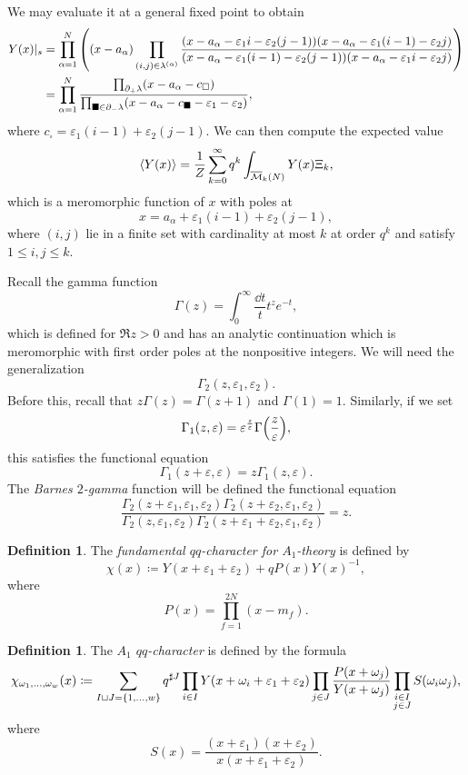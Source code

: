 \documentclass[leqno, openany]{memoir}
\theoremstyle{definition}
\newtheorem{defn}[thm]{Definition}
\theoremstyle{remark}
\theoremstyle{plain}
\theoremstyle{definition}
\theoremstyle{remark}
\newcommand{\ep}{\varepsilon}
\newcommand{\mc}[1]{\mathcal{#1}}
\newcommand{\ol}[1]{\overline{#1}}
\begin{document}
We may evaluate it at a general fixed point to obtain
\begin{align*}
    Y(x)|_s &= \prod_{\alpha=1}^N \qty((x-a_{\alpha}) \prod_{(i,j) \in \lambda^{(\alpha)}} \frac{(x-a_{\alpha}-\ep_1 i - \ep_2(j-1))(x-a_{\alpha} - \ep_1(i-1) - \ep_2 j)}{(x-a_{\alpha}-\ep_1(i-1) - \ep_2(j-1))(x-a_{\alpha}-\ep_1 i - \ep_2 j)}) \\
    &= \prod_{\alpha=1}^N \frac{\prod_{\box \in \partial_+ \lambda} (x-a_{\alpha} - c_{\square})}{\prod_{\blacksquare \in \partial_- \lambda} (x-a_{\alpha} - c_{\blacksquare} - \ep_1 - \ep_2)},
\end{align*}
where $c_{\square} = \ep_1(i-1) + \ep_2(j-1)$. We can then compute the expected value
\[ \ev{Y(x)} = \frac{1}{Z} \sum_{k=0}^{\infty} q^k \int_{\ol{\mc{M}}_k(N)} Y(x) \Xi_k, \]
which is a meromorphic function of $x$ with poles at
\[ x= a_{\alpha} + \ep_1(i-1) + \ep_2(j-1), \]
where $(i, j)$ lie in a finite set with cardinality at most $k$ at order $q^k$ and satisfy $1 \leq i, j \leq k$.

Recall the gamma function
\[ \Gamma(z) = \int_0^{\infty} \frac{\dd t}{t} t^z e^{-t}, \]
which is defined for $\Re z > 0$ and has an analytic continuation which is meromorphic with first order poles at the nonpositive integers. We will need the generalization
\[ \Gamma_2(z, \ep_1, \ep_2). \]
Before this, recall that $z \Gamma(z) = \Gamma(z+1)$ and $\Gamma(1) = 1$. Similarly, if we set
\[ \Gamma_1(z, \ep) = \ep^{\frac{z}{\ep}} \Gamma\qty(\frac{z}{\ep}), \]
this satisfies the functional equation
\[ \Gamma_1(z+\ep, \ep) = z \Gamma_1(z, \ep). \]
The \textit{Barnes $2$-gamma} function will be defined the functional equation
\[ \frac{\Gamma_2(z+\ep_1, \ep_1, \ep_2)\Gamma_2(z+\ep_2, \ep_1, \ep_2)}{\Gamma_2(z, \ep_1, \ep_2) \Gamma_2(z+\ep_1+\ep_2, \ep_1, \ep_2)} = z. \]

\begin{defn}
    The \textit{fundamental $qq$-character for $A_1$-theory} is defined by
    \[ \chi(x) \coloneqq Y(x+\ep_1 + \ep_2) + q P(x) Y(x)^{-1}, \]
    where
    \[ P(x) = \prod_{f=1}^{2N}(x-m_f). \]
\end{defn}

\begin{defn}
    The \textit{$A_1$ $qq$-character} is defined by the formula
    \[ \chi_{\omega_1, \ldots, \omega_w}(x) \coloneqq \sum_{I \sqcup J = \qty{1,\ldots,w}} q^{\sharp J} \prod_{i \in I} Y(x + \omega_i + \ep_1 + \ep_2) \prod_{j \in J} \frac{P(x+\omega_j)}{Y(x+\omega_j)} \prod_{\substack{i \in I \\ j \in J}} S(\omega_i \omega_j), \]
    where
    \[ S(x) = \frac{(x+\ep_1)(x+\ep_2)}{x(x+\ep_1+\ep_2)}. \]
\end{defn}
\end{document}
